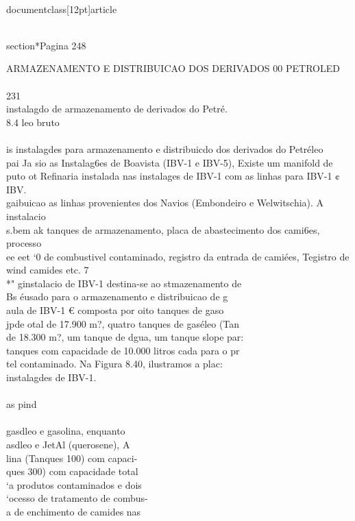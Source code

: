 \\documentclass[12pt]{article}
\begin{document}
\\section*{Pagina 248}

ARMAZENAMENTO E DISTRIBUICAO DOS DERIVADOS 00 PETROLED\\
\\
231\\
instalagdo de armazenamento de derivados do Petré.\\
8.4 leo bruto\\
\\
is instalagdes para armazenamento e distribuicdo dos derivados do Petréleo\\
pai Ja sio as Instalag6es de Boavista (IBV-1 e IBV-5), Existe um manifold de\\
puto ot Refinaria instalada nas instalages de IBV-1 com as linhas para IBV-1 ¢ IBV.\\
gaibuicao as linhas provenientes dos Navios (Embondeiro e Welwitschia). A instalacio\\
s.bem ak tanques de armazenamento, placa de abastecimento dos cami6es, processo\\
ee eet ‘0 de combustivel contaminado, registro da entrada de camiées, Tegistro de\\
wind camides etc. 7\\
*" ginstalacio de IBV-1 destina-se ao stmazenamento de\\
Bs éusado para o armazenamento e distribuicao de g\\
aula de IBV-1 € composta por oito tanques de gaso\\
jpde otal de 17.900 m?, quatro tanques de gaséleo (Tan\\
de 18.300 m?, um tanque de dgua, um tanque slope par:\\
tanques com capacidade de 10.000 litros cada para o pr\\
tel contaminado. Na Figura 8.40, ilustramos a plac:\\
instalagdes de IBV-1.\\
\\
as pind\\
\\
gasdleo e gasolina, enquanto\\
asdleo e JetAl (querosene), A\\
lina (Tanques 100) com capaci-\\
ques 300) com capacidade total\\
‘a produtos contaminados e dois\\
‘ocesso de tratamento de combus-\\
a de enchimento de camides nas\\
\end{document}
